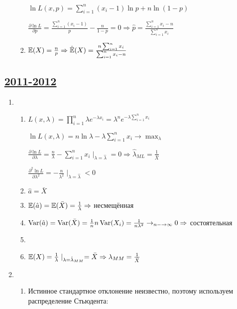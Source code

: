 \begin{enumerate}[resume]
\begin{enumerate}
\begin{enumerate}
$\ln L (x, p) = \sum_{i=1}^n(x_i-1) \ln p  + n\ln(1-p)$

$\frac{\partial \ln L}{\partial p} = \frac{\sum_{i=1}^n(x_i-1)}{p} - \frac{n}{1-p} = 0 \Rightarrow \hat{p} = \frac{\sum_{i=1}^n x_i - n}{\sum_{i=1}^n x_i}$
\item $\operatorname{\mathbb{E}}(X) = \frac{n}{p} \Rightarrow \hat{\operatorname{\mathbb{E}}}(X) = \frac{n\sum_{i=1}^n x_i}{\sum_{i=1}^n x_i - n}$
\end{enumerate}
\end{enumerate}


\subsection[2011-2012]{\hyperref[sec:kr_03_2011_2012]{2011-2012}}
\label{sec:sol_kr_03_2011_2012}


\begin{enumerate}
\item
\begin{enumerate}
\item $L (x, \lambda) = \prod_{i=1}^{n}\lambda e^{-\lambda x_i} = \lambda^n e^{-\lambda \sum_{i=1}^{n}x_i}$

$\ln L (x, \lambda) = n\ln\lambda - \lambda\sum_{i=1}^n x_i \to \max_\lambda$

$\frac{\partial \ln L}{\partial \lambda} = \frac{n}{\lambda} - \sum_{i=1}^{n}x_i \mid_{\lambda = \hat{\lambda}} = 0 \Rightarrow \hat{\lambda}_{ML} = \frac{1}{\bar{X}}$

$\frac{\partial^2 \ln L}{\partial \lambda^2} = -\frac{n}{\lambda^2} \mid_{\lambda=\hat{\lambda}} < 0$
\item $\hat{a} = \bar{X}$
\item $\operatorname{\mathbb{E}}(\hat{a}) = \operatorname{\mathbb{E}}(\bar{X}) = \frac{1}{\lambda} \Rightarrow$  несмещённая
\item $\operatorname{Var}(\hat{a}) = \operatorname{Var}(\bar{X}) = \frac{1}{n}n\operatorname{Var}(X_i) = \frac{1}{n\lambda^2} \to_{n-\to\infty} 0 \Rightarrow$ состоятельная
\item
\item $\operatorname{\mathbb{E}}(X) = \frac{1}{\lambda} \mid_{\lambda = \hat{\lambda}_{MM}} = \bar{X} \Rightarrow \lambda_{MM} = \frac{1}{\bar{X}}$
\end{enumerate}
\item
\begin{enumerate}
\item Истинное стандартное отклонение неизвестно, поэтому используем распределение Стьюдента:


\end{enumerate}
\end{enumerate}
\end{enumerate}
